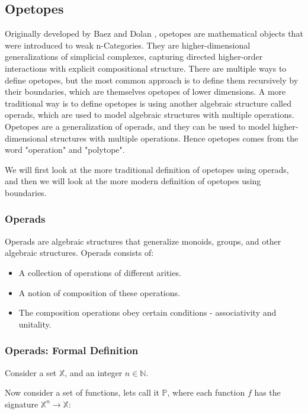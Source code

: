 
\subsection{Opetopes}
Originally developed by Baez and Dolan \citep{baez1997higher}, opetopes are mathematical objects that were introduced to weak n-Categories. They are higher-dimensional generalizations of simplicial complexes, capturing directed higher-order interactions with explicit compositional structure. There are multiple ways to define opetopes, but the most common approach is to define them recursively by their boundaries, which are themselves opetopes of lower dimensions. A more traditional way is to define opetopes is using another algebraic structure called operads, which are used to model algebraic structures with multiple operations. Opetopes are a generalization of operads, and they can be used to model higher-dimensional structures with multiple operations. Hence opetopes comes from the word "operation" and "polytope".

We will first look at the more traditional definition of opetopes using operads, and then we will look at the more modern definition of opetopes using boundaries.

\subsubsection{Operads}

Operads are algebraic structures that generalize monoids, groups, and other algebraic structures. Operads consists of:

\begin{itemize}
  \item A collection of operations of different arities.
  \item A notion of composition of these operations.
  \item The composition operations obey certain conditions - associativity and unitality.
\end{itemize}

\subsubsection{Operads: Formal Definition}

Consider a set $\mathbb{X}$, and an integer $n \in \mathbb{N}$.

Now consider a set of functions, lets call it $\mathbb{P}$, where each function $f$ has the signature $\mathbb{X}^n \to \mathbb{X}$:

